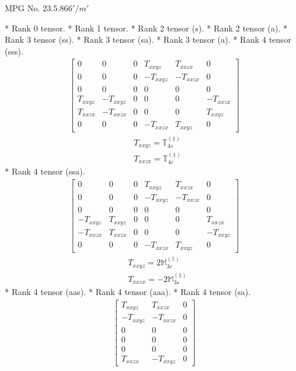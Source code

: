 \documentclass[fleqn,8pt,landscape]{jsarticle}
\begin{document}
\setcounter{MaxMatrixCols}{32}

\renewcommand{\tablename}{Table~}
\renewcommand{\figurename}{Figure~}
\begin{center}
\LARGE
MPG No. 23.5.86\quad$6'/m'$
\end{center}
* Rank 0 tensor.
* Rank 1 tensor.
* Rank 2 tensor (s).
* Rank 2 tensor (a).
* Rank 3 tensor (ss).
* Rank 3 tensor (sa).
* Rank 3 tensor (a).
* Rank 4 tensor (sss).
\begin{align*}
\begin{bmatrix} 0 & 0 & 0 & T_{xxyz} & T_{xxzx} & 0 \\ 0 & 0 & 0 & - T_{xxyz} & - T_{xxzx} & 0 \\ 0 & 0 & 0 & 0 & 0 & 0 \\ T_{xxyz} & - T_{xxyz} & 0 & 0 & 0 & - T_{xxzx} \\ T_{xxzx} & - T_{xxzx} & 0 & 0 & 0 & T_{xxyz} \\ 0 & 0 & 0 & - T_{xxzx} & T_{xxyz} & 0 \end{bmatrix}
\end{align*}
\begin{align*}
& T_{xxyz} = \mathbb{T}_{4s}^{(1)} \\
& T_{xxzx} = \mathbb{T}_{4c}^{(1)}
\end{align*}
* Rank 4 tensor (ssa).
\begin{align*}
\begin{bmatrix} 0 & 0 & 0 & T_{xxyz} & T_{xxzx} & 0 \\ 0 & 0 & 0 & - T_{xxyz} & - T_{xxzx} & 0 \\ 0 & 0 & 0 & 0 & 0 & 0 \\ - T_{xxyz} & T_{xxyz} & 0 & 0 & 0 & T_{xxzx} \\ - T_{xxzx} & T_{xxzx} & 0 & 0 & 0 & - T_{xxyz} \\ 0 & 0 & 0 & - T_{xxzx} & T_{xxyz} & 0 \end{bmatrix}
\end{align*}
\begin{align*}
& T_{xxyz} = 2 \mathbb{M}_{3c}^{(1)} \\
& T_{xxzx} = - 2 \mathbb{M}_{3s}^{(1)}
\end{align*}
* Rank 4 tensor (aas).
* Rank 4 tensor (aaa).
* Rank 4 tensor (sa).
\begin{align*}
\begin{bmatrix} T_{xxyz} & T_{xxzx} & 0 \\ - T_{xxyz} & - T_{xxzx} & 0 \\ 0 & 0 & 0 \\ 0 & 0 & 0 \\ 0 & 0 & 0 \\ T_{xxzx} & - T_{xxyz} & 0 \end{bmatrix}
\end{align*}
\end{document}
